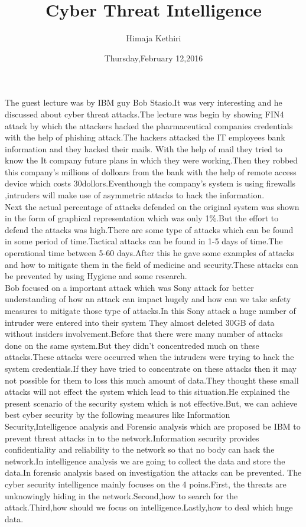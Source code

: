 \documentclass{article}
\title{Cyber Threat Intelligence}
\author{Himaja Kethiri}
\date{Thursday,February 12,2016}
\begin{document}
\maketitle

The guest lecture was by  IBM guy Bob Stasio.It was very interesting and he discussed about cyber threat attacks.The lecture was begin by showing FIN4 attack by which the attackers hacked the pharmaceutical companies credentials with the help of phishing attack.The hackers attacked the IT employees bank information and they hacked their mails. With the help of mail they tried to know the It company future plans in which they were working.Then they robbed this company’s millions of dolloars from the bank with the help of remote access device which costs 30dollors.Eventhough the company’s system is using firewalls ,intruders will make use of asymmetric attacks to hack the information.\\
 
Next the actual percentage of attacks defended  on the original system was shown in the form of graphical representation which was only 1\%.But the effort to defend the attacks was high.There are some type of attacks which can be found in some period of time.Tactical attacks can be found in 1-5 days of time.The operational time between 5-60 days.After this he gave some examples of attacks and how to mitigate them in the field of medicine and security.These attacks can be prevented by using Hygiene and some research.\\

Bob focused on a important attack which was Sony attack for better understanding of how an attack can impact hugely and how can we take safety measures to mitigate those type of attacks.In this Sony attack a huge number of intruder were entered into their system They almost deleted 30GB of data without insiders involvement.Before that there were many number of attacks done on the same system.But they didn’t concentreded much on these attacks.These attacks were occurred when the intruders were trying to hack the system credentials.If they have tried to concentrate on these attacks then it may not possible for them to loss this much amount of data.They thought these small attacks will not effect the system which lead to this situation.He explained the present scenario of the security system which is not effective.But, we can achieve best cyber security by the following measures like Information Security,Intelligence analysis and Forensic analysis which are proposed be IBM to prevent threat attacks in to the network.Information security provides confidentiality and reliability to the network so that no body can hack the network.In intelligence analysis we are going to collect the data and store the data.In forensic analysis based on investigation the attacks can be prevented.
The cyber security intelligence mainly focuses on the 4 poins.First, the threats are unknowingly hiding in the network.Second,how to search for the attack.Third,how should we focus on intelligence.Lastly,how to deal which huge data.\\
\end{document}
